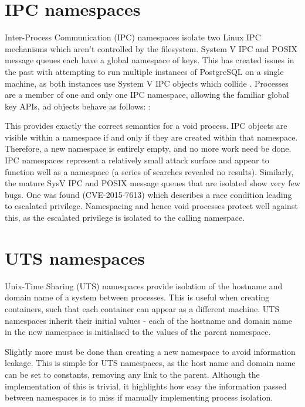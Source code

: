 \documentclass[12pt,a4paper,twoside]{report}
\begin{document}
\section{IPC namespaces}
\label{sec:voiding-ipc}

Inter-Process Communication (IPC) namespaces isolate two Linux IPC mechanisms which aren't controlled by the filesystem. System V IPC and POSIX message queues each have a global namespace of keys. This has created issues in the past with attempting to run multiple instances of PostgreSQL on a single machine, as both instances use System V IPC objects which collide \citep[§4.3]{barham_xen_2003}. Processes are a member of one and only one IPC namespace, allowing the familiar global key APIs, ad objects behave as follows: \citep{free_software_foundation_ipc_namespaces7_2021}:


This provides exactly the correct semantics for a void process. IPC objects are visible within a namespace if and only if they are created within that namespace. Therefore, a new namespace is entirely empty, and no more work need be done. IPC namespaces represent a relatively small attack surface and appear to function well as a namespace (a series of searches revealed no results). Similarly, the mature SysV IPC and POSIX message queues that are isolated show very few bugs. One was found (CVE-2015-7613) which describes a race condition leading to escalated privilege. Namespacing and hence void processes protect well against this, as the escalated privilege is isolated to the calling namespace.

\section{UTS namespaces}
\label{sec:voiding-uts}

Unix-Time Sharing (UTS) namespaces provide isolation of the hostname and domain name of a system between processes. This is useful when creating containers, such that each container can appear as a different machine. UTS namespaces inherit their initial values - each of the hostname and domain name in the new namespace is initialised to the values of the parent namespace.

Slightly more must be done than creating a new namespace to avoid information leakage. This is simple for UTS namespaces, as the host name and domain name can be set to constants, removing any link to the parent. Although the implementation of this is trivial, it highlights how easy the information passed between namespaces is to miss if manually implementing process isolation.
\end{document}
